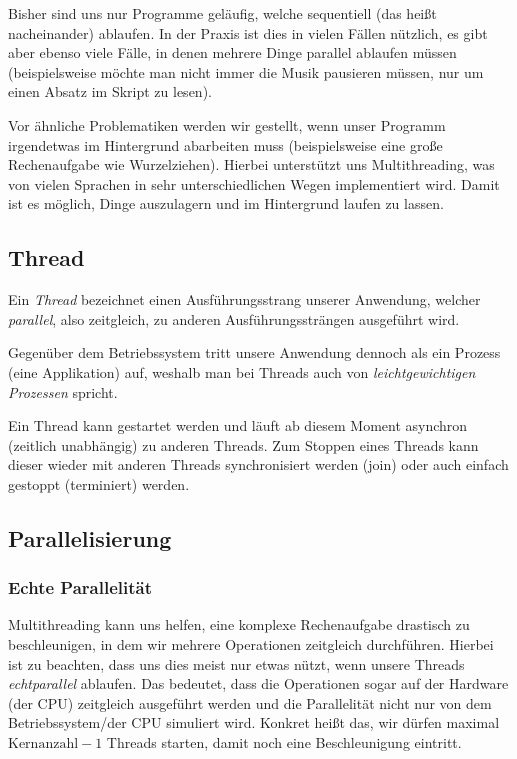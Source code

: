 
Bisher sind uns nur Programme geläufig, welche sequentiell (das heißt nacheinander) ablaufen. In der Praxis ist dies in vielen Fällen nützlich, es gibt aber ebenso viele Fälle, in denen mehrere Dinge parallel ablaufen müssen (beispielsweise möchte man nicht immer die Musik pausieren müssen, nur um einen Absatz im Skript zu lesen).

Vor ähnliche Problematiken werden wir gestellt, wenn unser Programm irgendetwas im Hintergrund abarbeiten muss (beispielsweise eine große Rechenaufgabe wie Wurzelziehen). Hierbei unterstützt uns Multithreading, was von vielen Sprachen in sehr unterschiedlichen Wegen implementiert wird. Damit ist es möglich, Dinge auszulagern und im Hintergrund laufen zu lassen.

\subsection{Thread}
	Ein \textit{Thread} bezeichnet einen Ausführungsstrang unserer Anwendung, welcher \textit{parallel}, also zeitgleich, zu anderen Ausführungssträngen ausgeführt wird.
	
	Gegenüber dem Betriebssystem tritt unsere Anwendung dennoch als ein Prozess (eine Applikation) auf, weshalb man bei Threads auch von \textit{leichtgewichtigen Prozessen} spricht.
	
	Ein Thread kann gestartet werden und läuft ab diesem Moment asynchron (zeitlich unabhängig) zu anderen Threads. Zum Stoppen eines Threads kann dieser wieder mit anderen Threads synchronisiert werden (join) oder auch einfach gestoppt (terminiert) werden.

\subsection{Parallelisierung}
	\subsubsection{Echte Parallelität}
		Multithreading kann uns helfen, eine komplexe Rechenaufgabe drastisch zu beschleunigen, in dem wir mehrere Operationen zeitgleich durchführen. Hierbei ist zu beachten, dass uns dies meist nur etwas nützt, wenn unsere Threads \textit{echtparallel} ablaufen. Das bedeutet, dass die Operationen sogar auf der Hardware (der CPU) zeitgleich ausgeführt werden und die Parallelität nicht nur von dem Betriebssystem/der CPU simuliert wird. Konkret heißt das, wir dürfen maximal \( \text{Kernanzahl} - 1 \) Threads starten, damit noch eine Beschleunigung eintritt.
	
